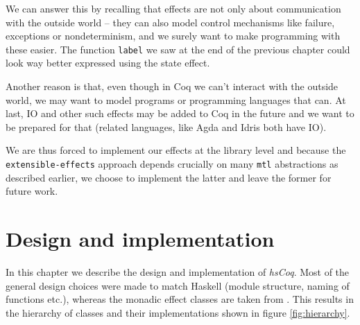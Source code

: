 \documentclass[declaration,inz,english,shortabstract]{iithesis}
\newcommand{\libname}{\textit{hsCoq}}
\newcommand{\m}[1]{\texttt{#1}}
\begin{document}
We can answer this by recalling that effects are not only about communication with the outside world -- they can also model control mechanisms like failure, exceptions or nondeterminism, and we surely want to make programming with these easier. The function \m{label} we saw at the end of the previous chapter could look way better expressed using the state effect.

Another reason is that, even though in Coq we can't interact with the outside world, we may want to model programs or programming languages that can. At last, IO and other such effects may be added to Coq in the future and we want to be prepared for that (related languages, like Agda \cite{Agda} and Idris \cite{Idris} both have IO).

We are thus forced to implement our effects at the library level and because the \m{extensible-effects} approach depends crucially on many \m{mtl} abstractions as described earlier, we choose to implement the latter and leave the former for future work.

\chapter{Design and implementation}

In this chapter we describe the design and implementation of \libname. Most of the general design choices were made to match Haskell (module structure, naming of functions etc.), whereas the monadic effect classes are taken from \cite{JustDoIt}. This results in the hierarchy of classes and their implementations shown in figure \ref{fig:hierarchy}.
\end{document}
